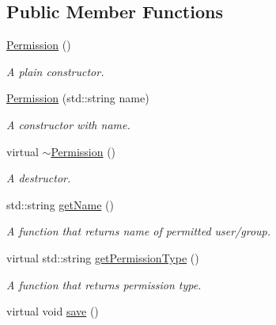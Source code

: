 \subsection*{Public Member Functions}
\begin{DoxyCompactItemize}
\item 
\hypertarget{class_r_c_f_1_1_server_1_1_permission_a272f0e1806268172ed816b502abcea50}{}\hyperlink{class_r_c_f_1_1_server_1_1_permission_a272f0e1806268172ed816b502abcea50}{Permission} ()\label{class_r_c_f_1_1_server_1_1_permission_a272f0e1806268172ed816b502abcea50}

\begin{DoxyCompactList}\small\item\em A plain constructor. \end{DoxyCompactList}\item 
\hyperlink{class_r_c_f_1_1_server_1_1_permission_af9145eccbe583e65a2b136ad6b49959b}{Permission} (std\+::string name)
\begin{DoxyCompactList}\small\item\em A constructor with name. \end{DoxyCompactList}\item 
\hypertarget{class_r_c_f_1_1_server_1_1_permission_af3de114b564778e0b829b802553f9dd8}{}virtual \hyperlink{class_r_c_f_1_1_server_1_1_permission_af3de114b564778e0b829b802553f9dd8}{$\sim$\+Permission} ()\label{class_r_c_f_1_1_server_1_1_permission_af3de114b564778e0b829b802553f9dd8}

\begin{DoxyCompactList}\small\item\em A destructor. \end{DoxyCompactList}\item 
std\+::string \hyperlink{class_r_c_f_1_1_server_1_1_permission_a84e14c7681dff3e4abb9f1e7d0d7a0fa}{get\+Name} ()
\begin{DoxyCompactList}\small\item\em A function that returns name of permitted user/group. \end{DoxyCompactList}\item 
virtual std\+::string \hyperlink{class_r_c_f_1_1_server_1_1_permission_a5aa502140c4bccfb74ce596de0ff88b0}{get\+Permission\+Type} ()
\begin{DoxyCompactList}\small\item\em A function that returns permission type. \end{DoxyCompactList}\item 
\hypertarget{class_r_c_f_1_1_server_1_1_permission_aad022773af6f00d4d195eb75fcfdccde}{}virtual void \hyperlink{class_r_c_f_1_1_server_1_1_permission_aad022773af6f00d4d195eb75fcfdccde}{save} ()\label{class_r_c_f_1_1_server_1_1_permission_aad022773af6f00d4d195eb75fcfdccde}


\end{DoxyCompactItemize}
